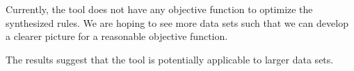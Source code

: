 Currently, the tool does not have any objective function to optimize the synthesized rules.
We are hoping to see more data sets such that we can develop a clearer picture
for a reasonable objective function.



The results suggest that the tool is potentially applicable to larger data sets.




